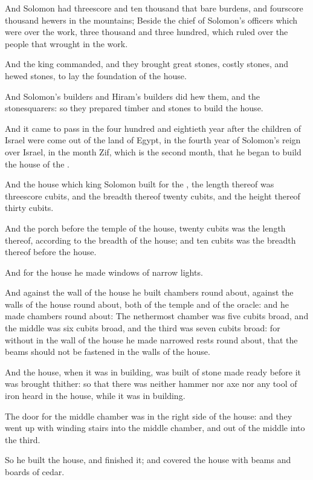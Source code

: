 \Verse And Solomon had threescore and ten thousand that bare burdens, and fourscore thousand hewers in the mountains; \Verse Beside the chief of Solomon's officers which were over the work, three thousand and three hundred, which ruled over the people that wrought in the work.

\Verse And the king commanded, and they brought great stones, costly stones, and hewed stones, to lay the foundation of the house.

\Verse And Solomon's builders and Hiram's builders did hew them, and the stonesquarers: so they prepared timber and stones to build the house.


\Chapter
\Verse And it came to pass in the four hundred and eightieth year after the children of Israel were come out of the land of Egypt, in the fourth year of Solomon's reign over Israel, in the month Zif, which is the second month, that he began to build the house of the \LORD.

\Verse And the house which king Solomon built for the \LORD, the length thereof was threescore cubits, and the breadth thereof twenty cubits, and the height thereof thirty cubits.

\Verse And the porch before the temple of the house, twenty cubits was the length thereof, according to the breadth of the house; and ten cubits was the breadth thereof before the house.

\Verse And for the house he made windows of narrow lights.

\Verse And against the wall of the house he built chambers round about, against the walls of the house round about, both of the temple and of the oracle: and he made chambers round about: \Verse The nethermost chamber was five cubits broad, and the middle was six cubits broad, and the third was seven cubits broad: for without in the wall of the house he made narrowed rests round about, that the beams should not be fastened in the walls of the house.

\Verse And the house, when it was in building, was built of stone made ready before it was brought thither: so that there was neither hammer nor axe nor any tool of iron heard in the house, while it was in building.

\Verse The door for the middle chamber was in the right side of the house: and they went up with winding stairs into the middle chamber, and out of the middle into the third.

\Verse So he built the house, and finished it; and covered the house with beams and boards of cedar.

